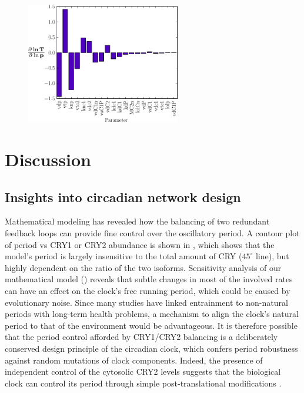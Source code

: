 \begin{figure}[p]
  \centering
  \includegraphics[width=0.6\textwidth]{chap2/figures/firstordersens.pdf}
  \label{fig:firstordersens}
\end{figure}

\section{Discussion}
\subsection{Insights into circadian network design}
Mathematical modeling has revealed how the balancing of two redundant feedback loops can provide fine control over the oscillatory period. 
A contour plot of period vs CRY1 or CRY2 abundance is shown in , which shows that the model's period is largely insensitive to the total amount of CRY ($45^\circ$ line), but highly dependent on the ratio of the two isoforms. 
Sensitivity analysis of our mathematical model () reveals that subtle changes in most of the involved rates can have an effect on the clock's free running period, which could be caused by evolutionary noise. 
Since many studies have linked entrainment to non-natural periods with long-term health problems, a mechanism to align the clock’s natural period to that of the environment would be advantageous. 
It is therefore possible that the period control afforded by CRY1/CRY2 balancing is a deliberately conserved design principle of the circadian clock, which confers period robustness against random mutations of clock components. 
Indeed, the presence of independent control of the cytosolic CRY2 levels suggests that the biological clock can control its period through simple post-translational modifications \cite{Kurabayashi2010}. 

